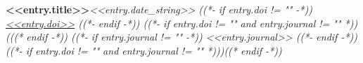 \resumeSubheading
    {\textbf{<<entry.title>>}}{\textit{<<entry.date_string>>}}
    {
\textit{((*- if entry.doi != "" -*))
\href{<<entry.doi_url>>}{<<entry.doi>>}
((*- endif -*))
((*- if entry.doi != "" and entry.journal != "" *)) (((* endif -*))
((*- if entry.journal != "" -*))
<<entry.journal>>
((*- endif -*))
((*- if entry.doi != "" and entry.journal != "" *)))((* endif -*))}
}{}
    \resumeItemListStart
    \resumeItemListEnd
